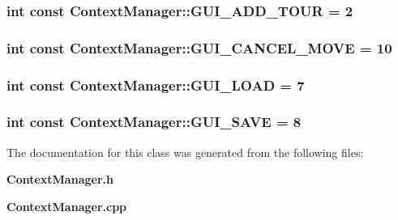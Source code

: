 \subsubsection[{\-G\-U\-I\-\_\-\-A\-D\-D\-\_\-\-T\-O\-U\-R}]{\setlength{\rightskip}{0pt plus 5cm}int const {\bf \-Context\-Manager\-::\-G\-U\-I\-\_\-\-A\-D\-D\-\_\-\-T\-O\-U\-R} = 2\hspace{0.3cm}{\ttfamily  [static]}}\label{class_context_manager_a38dfa47865e028cc91dff6d947af4c8e}
\subsubsection[{\-G\-U\-I\-\_\-\-C\-A\-N\-C\-E\-L\-\_\-\-M\-O\-V\-E}]{\setlength{\rightskip}{0pt plus 5cm}int const {\bf \-Context\-Manager\-::\-G\-U\-I\-\_\-\-C\-A\-N\-C\-E\-L\-\_\-\-M\-O\-V\-E} = 10\hspace{0.3cm}{\ttfamily  [static]}}\label{class_context_manager_ad9c337d5ea9c5f071fcc8684da9935e6}
\subsubsection[{\-G\-U\-I\-\_\-\-L\-O\-A\-D}]{\setlength{\rightskip}{0pt plus 5cm}int const {\bf \-Context\-Manager\-::\-G\-U\-I\-\_\-\-L\-O\-A\-D} = 7\hspace{0.3cm}{\ttfamily  [static]}}\label{class_context_manager_a97f871f4f331954b45bd16b2f26f00aa}
\subsubsection[{\-G\-U\-I\-\_\-\-S\-A\-V\-E}]{\setlength{\rightskip}{0pt plus 5cm}int const {\bf \-Context\-Manager\-::\-G\-U\-I\-\_\-\-S\-A\-V\-E} = 8\hspace{0.3cm}{\ttfamily  [static]}}\label{class_context_manager_aeb99ce2030a6f997a8bbe811b5b9ff52}


\-The documentation for this class was generated from the following files\-:\begin{DoxyCompactItemize}
\item 
{\bf \-Context\-Manager.\-h}\item 
{\bf \-Context\-Manager.\-cpp}\end{DoxyCompactItemize}
